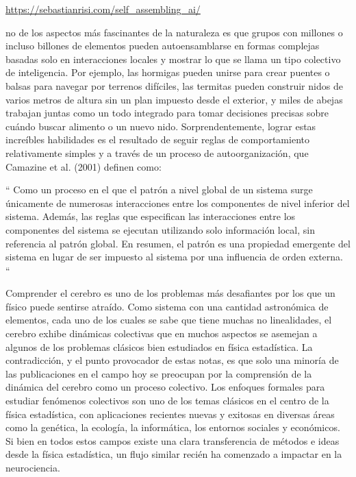 \url{https://sebastianrisi.com/self_assembling_ai/}

no de los aspectos más fascinantes de la naturaleza es que grupos con millones o incluso billones de elementos pueden autoensamblarse en formas complejas basadas solo en interacciones locales y mostrar lo que se llama un tipo colectivo de inteligencia. Por ejemplo, las hormigas pueden unirse para crear puentes o balsas para navegar por terrenos difíciles, las termitas pueden construir nidos de varios metros de altura sin un plan impuesto desde el exterior, y miles de abejas trabajan juntas como un todo integrado para tomar decisiones precisas sobre cuándo buscar alimento o un nuevo nido. Sorprendentemente, lograr estas increíbles habilidades es el resultado de seguir reglas de comportamiento relativamente simples y a través de un proceso de autoorganización, que Camazine et al. (2001) definen como:

“ Como un proceso en el que el patrón a nivel global de un sistema surge únicamente de numerosas interacciones entre los componentes de nivel inferior del sistema. Además, las reglas que especifican las interacciones entre los componentes del sistema se ejecutan utilizando solo información local, sin referencia al patrón global. En resumen, el patrón es una propiedad emergente del sistema en lugar de ser impuesto al sistema por una influencia de orden externa. “

Comprender el cerebro es uno de los problemas más desafiantes por los que un físico puede sentirse atraído. Como sistema con una cantidad astronómica de elementos, cada uno de los cuales se sabe que tiene muchas no linealidades, el cerebro exhibe dinámicas colectivas que en muchos aspectos se asemejan a algunos de los problemas clásicos bien estudiados en física estadística. La contradicción, y el punto provocador de estas notas, es que solo una minoría de las publicaciones en el campo hoy se preocupan por la comprensión de la dinámica del cerebro como un proceso colectivo. Los enfoques formales para estudiar fenómenos colectivos son uno de los temas clásicos en el centro de la física estadística, con aplicaciones recientes nuevas y exitosas en diversas áreas como la genética, la ecología, la informática, los entornos sociales y económicos. Si bien en todos estos campos existe una clara transferencia de métodos e ideas desde la física estadística, un flujo similar recién ha comenzado a impactar en la neurociencia.

